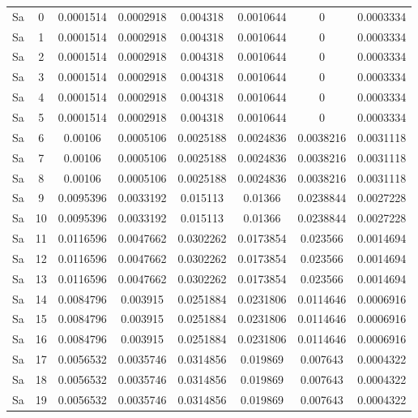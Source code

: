 \begin{center}
\begin{longtable}{cccccccc}
        \endfoot
        \endlastfoot
          Sa & 0 & 0.0001514 & 0.0002918 & 0.004318 & 0.0010644 & 0 & 0.0003334 \\ 
          Sa & 1 & 0.0001514 & 0.0002918 & 0.004318 & 0.0010644 & 0 & 0.0003334 \\ 
          Sa & 2 & 0.0001514 & 0.0002918 & 0.004318 & 0.0010644 & 0 & 0.0003334 \\  
          Sa & 3 & 0.0001514 & 0.0002918 & 0.004318 & 0.0010644 & 0 & 0.0003334 \\  
          Sa & 4 & 0.0001514 & 0.0002918 & 0.004318 & 0.0010644 & 0 & 0.0003334 \\  
          Sa & 5 & 0.0001514 & 0.0002918 & 0.004318 & 0.0010644 & 0 & 0.0003334 \\  
          Sa & 6 & 0.00106 & 0.0005106 & 0.0025188 & 0.0024836 & 0.0038216 & 0.0031118 \\  
          Sa & 7 & 0.00106 & 0.0005106 & 0.0025188 & 0.0024836 & 0.0038216 & 0.0031118 \\  
          Sa & 8 & 0.00106 & 0.0005106 & 0.0025188 & 0.0024836 & 0.0038216 & 0.0031118 \\  
          Sa & 9 & 0.0095396 & 0.0033192 & 0.015113 & 0.01366 & 0.0238844 & 0.0027228 \\  
          Sa & 10 & 0.0095396 & 0.0033192 & 0.015113 & 0.01366 & 0.0238844 & 0.0027228 \\  
          Sa & 11 & 0.0116596 & 0.0047662 & 0.0302262 & 0.0173854 & 0.023566 & 0.0014694 \\  
          Sa & 12 & 0.0116596 & 0.0047662 & 0.0302262 & 0.0173854 & 0.023566 & 0.0014694 \\  
          Sa & 13 & 0.0116596 & 0.0047662 & 0.0302262 & 0.0173854 & 0.023566 & 0.0014694 \\  
          Sa & 14 & 0.0084796 & 0.003915 & 0.0251884 & 0.0231806 & 0.0114646 & 0.0006916 \\  
          Sa & 15 & 0.0084796 & 0.003915 & 0.0251884 & 0.0231806 & 0.0114646 & 0.0006916 \\  
          Sa & 16 & 0.0084796 & 0.003915 & 0.0251884 & 0.0231806 & 0.0114646 & 0.0006916 \\  
          Sa & 17 & 0.0056532 & 0.0035746 & 0.0314856 & 0.019869 & 0.007643 & 0.0004322 \\  
          Sa & 18 & 0.0056532 & 0.0035746 & 0.0314856 & 0.019869 & 0.007643 & 0.0004322 \\  
          Sa & 19 & 0.0056532 & 0.0035746 & 0.0314856 & 0.019869 & 0.007643 & 0.0004322 \\  

\end{longtable}
\end{center}
